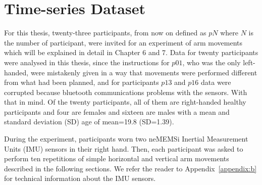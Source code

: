 
\chapter{Time-series Dataset}
\ifpdf
    \graphicspath{{chapter5/figs/raster/}{chapter5/figs/PDF/}{chapter5/figs/}}
\else
    \graphicspath{{chapter5/figs/vector/}{chapter5/figs/}}
\fi

%


For this thesis, twenty-three participants, from now on defined as $pN$ where $N$ is the number of participant, 
were invited for an experiment of arm movements which will be explained in detail in Chapter 6 and 7.
Data for twenty participants were analysed in this thesis,
since the instructions for $p01$, who was the only left-handed,
were mistakenly given in a way that movements were performed different
from what had been planned, and for participants $p13$ and $p16$ 
data were corrupted because bluetooth communications problems 
with the sensors. With that in mind.
Of the twenty participants, all of them are right-handed healthy participants 
and four are females and sixteen are males with a mean and standard deviation (SD) 
age of mean=19.8 (SD=1.39).

During the experiment, participants worn two neMEMSi Inertial Measurement Units (IMU) 
sensors in their right hand.
Then, each participant was asked to perform ten repetitions of simple horizontal
and vertical arm movements described in the following sections.
We refer the reader to Appendix~\ref{appendix:b} for technical information 
about the IMU sensors.

